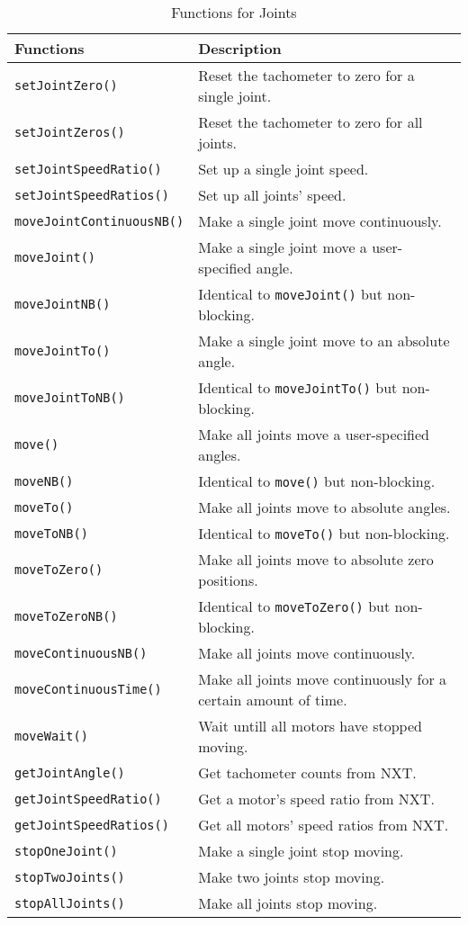 \begin{table}[!h]
\caption{Functions for Joints}
\begin{tabular}{ p{6cm}p{10cm} }\hline
Functions & Description\\
\hline
\texttt{setJointZero()}         &Reset the tachometer to zero for a single joint.\\
\texttt{setJointZeros()}        &Reset the tachometer to zero for all joints.\\
\texttt{setJointSpeedRatio()}   &Set up a single joint speed.\\
\texttt{setJointSpeedRatios()}  &Set up all joints' speed.\\
\texttt{moveJointContinuousNB()}&Make a single joint move continuously.\\
\texttt{moveJoint()}            &Make a single joint move a user-specified angle.\\
\texttt{moveJointNB()}          &Identical to \texttt{moveJoint()} but non-blocking.\\
\texttt{moveJointTo()}          &Make a single joint move to an absolute angle.\\
\texttt{moveJointToNB()}        &Identical to \texttt{moveJointTo()} but non-blocking.\\
\texttt{move()}                 &Make all joints move a user-specified angles.\\
\texttt{moveNB()}               &Identical to \texttt{move()} but non-blocking.\\
\texttt{moveTo()}               &Make all joints move to absolute angles.\\
\texttt{moveToNB()}             &Identical to \texttt{moveTo()} but non-blocking.\\
\texttt{moveToZero()}           &Make all joints move to absolute zero positions.\\
\texttt{moveToZeroNB()}         &Identical to \texttt{moveToZero()} but non-blocking.\\
\texttt{moveContinuousNB()}     &Make all joints move continuously.\\
\texttt{moveContinuousTime()}   &Make all joints move continuously for a certain amount of time.\\
\texttt{moveWait()}             &Wait untill all motors have stopped moving.\\
\texttt{getJointAngle()}        &Get tachometer counts from NXT.\\
\texttt{getJointSpeedRatio()}   &Get a motor's speed ratio from NXT.\\
\texttt{getJointSpeedRatios()}  &Get all motors' speed ratios from NXT.\\
\texttt{stopOneJoint()}         &Make a single joint stop moving.\\
\texttt{stopTwoJoints()}        &Make two joints stop moving.\\
\texttt{stopAllJoints()}        &Make all joints stop moving.\\
\hline
\end{tabular}
\end{table}

